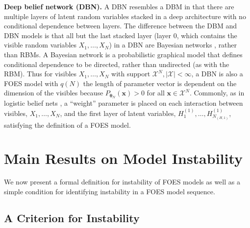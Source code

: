 \documentclass[numbib]{imamat}
\theoremstyle{theorem}
\theoremstyle{lemma}
\theoremstyle{example}
\theoremstyle{corollary}
\theoremstyle{definition}
\theoremstyle{remark}
\theoremstyle{approximation}
\theoremstyle{scheme}
\newcommand{\ak}[1]{{\color{blue} #1}}
\begin{document}
\textbf{Deep belief network (DBN).} A DBN resembles a DBM in that there are multiple layers of latent random variables stacked in a deep architecture with no conditional dependence between layers. The difference between the DBM and DBN models is that all but the last stacked layer \ak{(layer $0$, which contains the visible random variables $X_1, \dots, X_N$)} in a DBN are Bayesian networks \citep[see][]{pearl985bayesian}, rather than RBMs. A Bayesian network is a probabilistic graphical model that defines conditional dependence to be directed, rather than undirected (as with the RBM). Thus for visibles \(X_1, \dots, X_N\) with support \(\mathcal{X}^N, \mid \mathcal{X} \mid < \infty\), a DBN is also a FOES model with \(q(N)\) the length of parameter vector is dependent on the dimension of the visibles because \(P_{\boldsymbol \theta_N}(\boldsymbol x)>0\) for all \(\boldsymbol x \in\mathcal{X}^N\). Commonly, as in logistic belief nets \citep{neal1992connectionist}, a ``weight'' parameter is placed on each interaction between visibles, \(X_1, \dots, X_N\), and the first layer of latent variables, \(H^{(1)}_1, \dots, H^{(1)}_{N_{(H,1)}}\), satisfying the definition of a FOES model.

\hypertarget{instability-results}{%
\section{Main Results on Model Instability}\label{instability-results}}

We now present a formal definition for instability of FOES models as well as a simple condition for identifying instability in a FOES model sequence.

\hypertarget{criterion}{%
\subsection{A Criterion for Instability}\label{criterion}}
\end{document}
